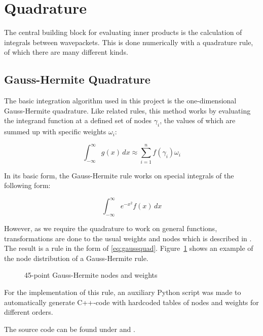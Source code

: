 \section{Quadrature}

The central building block for evaluating inner products is the calculation of
integrals between wavepackets.
This is done numerically with a quadrature rule, of which there are many
different kinds.


\subsection{Gauss-Hermite Quadrature}
\label{subsec:ghquad}

The basic integration algorithm used in this project is the one-dimensional
Gauss-Hermite quadrature.
Like related rules, this method works by evaluating the integrand function at a
defined set of nodes $\gamma_i$, the values of which are summed up with specific
weights $\omega_i$:

\begin{equation}
  \label{eq:gaussquad}
  \int_{-\infty}^{\infty} g(x) \, dx \approx \sum_{i=1}^{n} f(\gamma_i) \omega_i
\end{equation}

In its basic form, the Gauss-Hermite rule works on special integrals of the
following form:

\begin{equation}
  \int_{-\infty}^{\infty} e^{-x^2} f(x) \, dx
\end{equation}

However, as we require the quadrature to work on general functions,
transformations are done to the usual weights and nodes which is described in
\cite{B_master_thesis}.
The result is a rule in the form of \eqref{eq:gaussquad}.
Figure~\ref{fig:ghexample} shows an example of the node distribution of a
Gauss-Hermite rule.

\begin{figure}
  \center
  
  \caption{45-point Gauss-Hermite nodes and weights}
  \label{fig:ghexample}
\end{figure}

For the implementation of this rule, an auxiliary Python script was made to
automatically generate C++-code with hardcoded tables of nodes and weights for
different orders.

The source code can be found under  and
.


